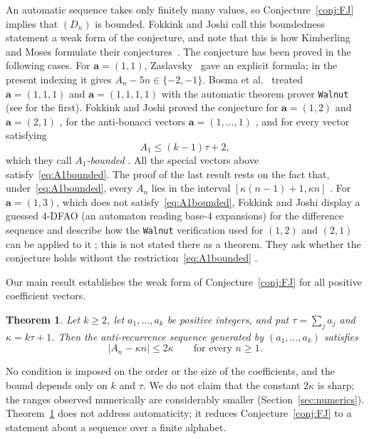 \documentclass{amsart}
\newtheorem{theorem}{Theorem}[section]
\theoremstyle{definition}
\theoremstyle{remark}
\numberwithin{equation}{section}
\numberwithin{table}{section}
\newcommand{\ba}{\mathbf{a}}
\begin{document}
An automatic sequence takes only finitely many values, so Conjecture~\ref{conj:FJ} implies that $(D_n)$ is bounded. Fokkink and Joshi call this boundedness statement a weak form of the conjecture, and note that this is how Kimberling and Moses formulate their conjectures~\cite[p.~6]{FJ}. The conjecture has been proved in the following cases. For $\ba=(1,1)$, Zaslavsky~\cite[Theorem~1]{Z} gave an explicit formula; in the present indexing it gives $A_n-5n\in\{-2,-1\}$. Bosma et al.~\cite[Section~4]{B} treated $\ba=(1,1,1)$ and $\ba=(1,1,1,1)$ with the automatic theorem prover \texttt{Walnut} (see \cite[Theorem~12]{B} for the first). Fokkink and Joshi proved the conjecture for $\ba=(1,2)$ and $\ba=(2,1)$ \cite[Theorems~1 and~2]{FJ}, for the anti-bonacci vectors $\ba=(1,\dots,1)$ \cite[Section~4 and Theorem~3]{FJ}, and for every vector satisfying
\begin{equation}\label{eq:A1bounded}
A_1\le(k-1)\tau+2,
\end{equation}
which they call \emph{$A_1$-bounded} \cite[Definition~1 and Theorem~4]{FJ}. All the special vectors above satisfy~\eqref{eq:A1bounded}. The proof of the last result rests on the fact that, under~\eqref{eq:A1bounded}, every $A_n$ lies in the interval $[\kappa(n-1)+1,\kappa n]$ \cite[Lemma~5]{FJ}. For $\ba=(1,3)$, which does not satisfy~\eqref{eq:A1bounded}, Fokkink and Joshi display a guessed $4$-DFAO (an automaton reading base-$4$ expansions) for the difference sequence and describe how the \texttt{Walnut} verification used for $(1,2)$ and $(2,1)$ can be applied to it \cite[Section~5]{FJ}; this is not stated there as a theorem. They ask whether the conjecture holds without the restriction~\eqref{eq:A1bounded} \cite[Section~6]{FJ}.

Our main result establishes the weak form of Conjecture~\ref{conj:FJ} for all positive coefficient vectors.

\begin{theorem}\label{thm:main}
Let $k\ge2$, let $a_1,\dots,a_k$ be positive integers, and put $\tau=\sum_{j}a_j$ and $\kappa=k\tau+1$. Then the anti-recurrence sequence generated by $(a_1,\dots,a_k)$ satisfies
\[
\lvert A_n-\kappa n\rvert\le 2\kappa\qquad\text{for every }n\ge1.
\]
\end{theorem}

No condition is imposed on the order or the size of the coefficients, and the bound depends only on $k$ and $\tau$. We do not claim that the constant $2\kappa$ is sharp; the ranges observed numerically are considerably smaller (Section~\ref{sec:numerics}). Theorem~\ref{thm:main} does not address automaticity; it reduces Conjecture~\ref{conj:FJ} to a statement about a sequence over a finite alphabet.
\end{document}

